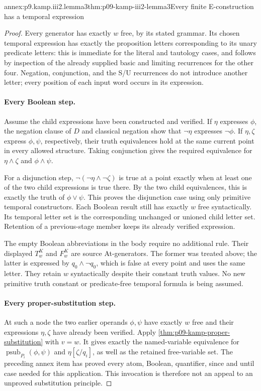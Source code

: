 \begin{annexitem}{annex:p9.kamp.iii2.lemma3}{thm:p09-kamp-iii2-lemma3}{Every finite E-construction has a temporal expression}
\begin{proof}
Every generator has exactly \(w\) free, by its stated grammar. Its
chosen temporal expression has exactly the proposition letters
corresponding to its unary predicate letters: this is immediate for
the literal and tautology cases, and follows by inspection of the
already supplied basic and limiting recurrences for the other four.
Negation, conjunction, and the S/U recurrences do not introduce another
letter; every position of each input word occurs in its expression.

\paragraph{Every Boolean step.}
Assume the child expressions have been constructed and verified. If
\(\eta\) expresses \(\phi\), the negation clause of \(D\) and
classical negation show that \(\neg\eta\) expresses \(\neg\phi\).
If \(\eta,\zeta\) express \(\phi,\psi\), respectively, their
truth equivalences hold at the same current point in every allowed
structure. Taking conjunction gives the required equivalence for
\(\eta\land\zeta\) and \(\phi\land\psi\).

For a disjunction step, \(\neg(\neg\eta\land\neg\zeta)\) is
true at a point exactly when at least one of the two child expressions
is true there. By the two child equivalences, this is exactly the truth
of \(\phi\lor\psi\). This proves the disjunction case using only
primitive temporal constructors. Each Boolean result still has exactly
\(w\) free syntactically. Its temporal letter set is the corresponding
unchanged or unioned child letter set. Retention of a previous-stage
member keeps its already verified expression.

The empty Boolean abbreviations in the body require no additional rule.
Their displayed \(T^K_w\) and \(F^K_w\) are source At-generators.
The former was treated above; the latter is expressed by
\(q_0\land\neg q_0\), which is false at every point and uses the
same letter. They retain \(w\) syntactically despite their constant
truth values. No new primitive truth constant or predicate-free temporal
formula is being assumed.

\paragraph{Every proper-substitution step.}
At such a node the two earlier operands \(\phi,\psi\) have exactly
\(w\) free and their expressions \(\eta,\zeta\) have already been
verified. Apply \cref{thm:p09-kamp-proper-substitution} with \(v=w\).
It gives exactly the named-variable equivalence for
\(\operatorname{psub}_{P_i}(\phi,\psi)\) and
\(\eta[\zeta/q_i]\), as well as the retained free-variable set.
The preceding annex item has proved every atom, Boolean, quantifier,
since and until case needed for this application. This invocation is
therefore not an appeal to an unproved substitution principle.


\end{proof}
\end{annexitem}
